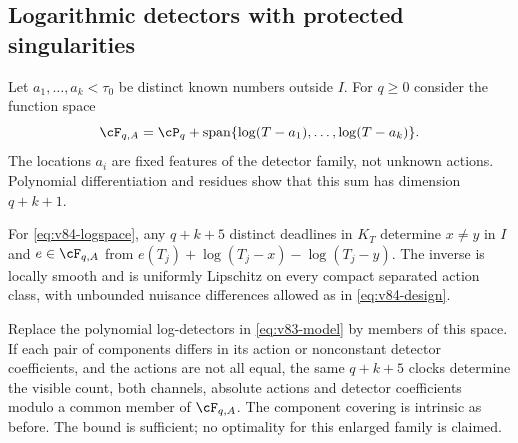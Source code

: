 \subsection{Logarithmic detectors with protected singularities}
Let $a_1,\ldots,a_k<\tau_0$ be distinct known numbers outside $I$.
For $q\ge0$ consider the function space
\begin{equation}\label{eq:v84-logspace}
 \cF_{q,A}=\cP_q+\operatorname{span}\{\log(T-a_1),\ldots,
                                  \log(T-a_k)\}.
\end{equation}
The locations $a_i$ are fixed features of the detector family, not
unknown actions. Polynomial differentiation and residues show that
this sum has dimension $q+k+1$.

\begin{theorem}\label{thm:v84-poles}
For \eqref{eq:v84-logspace}, any $q+k+5$ distinct deadlines in $K_T$
determine $x\ne y$ in $I$ and $e\in\cF_{q,A}$ from
$e(T_j)+\log(T_j-x)-\log(T_j-y)$. The inverse is locally smooth and
is uniformly Lipschitz on every compact separated action class, with
unbounded nuisance differences allowed as in \eqref{eq:v84-design}.

Replace the polynomial log-detectors in \eqref{eq:v83-model} by members
of this space. If each pair of components differs in its action or
nonconstant detector coefficients, and the actions are not all equal,
the same $q+k+5$ clocks determine the visible count, both channels,
absolute actions and detector coefficients modulo a common member of
$\cF_{q,A}$. The component covering is intrinsic as before. The bound
is sufficient; no optimality for this enlarged family is claimed.
\end{theorem}
